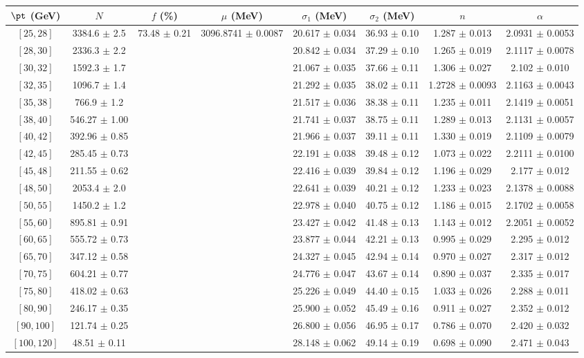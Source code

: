 \begin{tabular}{c||c|c|c|c|c|c|c}
$\pt$ (GeV) & $N$ & $f$ (\%) & $\mu$ (MeV) & $\sigma_1$ (MeV) & $\sigma_2$ (MeV) & $n$ & $\alpha$ \\
\hline
$[25, 28]$ & 3384.6 $\pm$ 2.5 & \multirow{19}{*}{73.48 $\pm$ 0.21} & \multirow{19}{*}{3096.8741 $\pm$ 0.0087} & 20.617 $\pm$ 0.034 & 36.93 $\pm$ 0.10 & 1.287 $\pm$ 0.013 & 2.0931 $\pm$ 0.0053\\
$[28, 30]$ & 2336.3 $\pm$ 2.2 &  &  & 20.842 $\pm$ 0.034 & 37.29 $\pm$ 0.10 & 1.265 $\pm$ 0.019 & 2.1117 $\pm$ 0.0078\\
$[30, 32]$ & 1592.3 $\pm$ 1.7 &  &  & 21.067 $\pm$ 0.035 & 37.66 $\pm$ 0.11 & 1.306 $\pm$ 0.027 & 2.102 $\pm$ 0.010\\
$[32, 35]$ & 1096.7 $\pm$ 1.4 &  &  & 21.292 $\pm$ 0.035 & 38.02 $\pm$ 0.11 & 1.2728 $\pm$ 0.0093 & 2.1163 $\pm$ 0.0043\\
$[35, 38]$ & 766.9 $\pm$ 1.2 &  &  & 21.517 $\pm$ 0.036 & 38.38 $\pm$ 0.11 & 1.235 $\pm$ 0.011 & 2.1419 $\pm$ 0.0051\\
$[38, 40]$ & 546.27 $\pm$ 1.00 &  &  & 21.741 $\pm$ 0.037 & 38.75 $\pm$ 0.11 & 1.289 $\pm$ 0.013 & 2.1131 $\pm$ 0.0057\\
$[40, 42]$ & 392.96 $\pm$ 0.85 &  &  & 21.966 $\pm$ 0.037 & 39.11 $\pm$ 0.11 & 1.330 $\pm$ 0.019 & 2.1109 $\pm$ 0.0079\\
$[42, 45]$ & 285.45 $\pm$ 0.73 &  &  & 22.191 $\pm$ 0.038 & 39.48 $\pm$ 0.12 & 1.073 $\pm$ 0.022 & 2.2111 $\pm$ 0.0100\\
$[45, 48]$ & 211.55 $\pm$ 0.62 &  &  & 22.416 $\pm$ 0.039 & 39.84 $\pm$ 0.12 & 1.196 $\pm$ 0.029 & 2.177 $\pm$ 0.012\\
$[48, 50]$ & 2053.4 $\pm$ 2.0 &  &  & 22.641 $\pm$ 0.039 & 40.21 $\pm$ 0.12 & 1.233 $\pm$ 0.023 & 2.1378 $\pm$ 0.0088\\
$[50, 55]$ & 1450.2 $\pm$ 1.2 &  &  & 22.978 $\pm$ 0.040 & 40.75 $\pm$ 0.12 & 1.186 $\pm$ 0.015 & 2.1702 $\pm$ 0.0058\\
$[55, 60]$ & 895.81 $\pm$ 0.91 &  &  & 23.427 $\pm$ 0.042 & 41.48 $\pm$ 0.13 & 1.143 $\pm$ 0.012 & 2.2051 $\pm$ 0.0052\\
$[60, 65]$ & 555.72 $\pm$ 0.73 &  &  & 23.877 $\pm$ 0.044 & 42.21 $\pm$ 0.13 & 0.995 $\pm$ 0.029 & 2.295 $\pm$ 0.012\\
$[65, 70]$ & 347.12 $\pm$ 0.58 &  &  & 24.327 $\pm$ 0.045 & 42.94 $\pm$ 0.14 & 0.970 $\pm$ 0.027 & 2.317 $\pm$ 0.012\\
$[70, 75]$ & 604.21 $\pm$ 0.77 &  &  & 24.776 $\pm$ 0.047 & 43.67 $\pm$ 0.14 & 0.890 $\pm$ 0.037 & 2.335 $\pm$ 0.017\\
$[75, 80]$ & 418.02 $\pm$ 0.63 &  &  & 25.226 $\pm$ 0.049 & 44.40 $\pm$ 0.15 & 1.033 $\pm$ 0.026 & 2.288 $\pm$ 0.011\\
$[80, 90]$ & 246.17 $\pm$ 0.35 &  &  & 25.900 $\pm$ 0.052 & 45.49 $\pm$ 0.16 & 0.911 $\pm$ 0.027 & 2.352 $\pm$ 0.012\\
$[90, 100]$ & 121.74 $\pm$ 0.25 &  &  & 26.800 $\pm$ 0.056 & 46.95 $\pm$ 0.17 & 0.786 $\pm$ 0.070 & 2.420 $\pm$ 0.032\\
$[100, 120]$ & 48.51 $\pm$ 0.11 &  &  & 28.148 $\pm$ 0.062 & 49.14 $\pm$ 0.19 & 0.698 $\pm$ 0.090 & 2.471 $\pm$ 0.043\\
\end{tabular}
